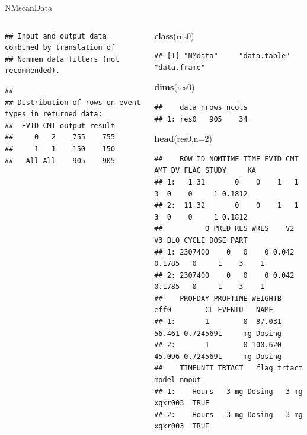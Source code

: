 \documentclass[
  8pt,
  ignorenonframetext,
  aspectratio=169]{beamer}
\newenvironment{Shaded}{\begin{snugshade}}{\end{snugshade}}
\newcommand{\DataTypeTok}[1]{\textcolor[rgb]{0.13,0.29,0.53}{#1}}
\newcommand{\DecValTok}[1]{\textcolor[rgb]{0.00,0.00,0.81}{#1}}
\newcommand{\KeywordTok}[1]{\textcolor[rgb]{0.13,0.29,0.53}{\textbf{#1}}}
\newcommand{\NormalTok}[1]{#1}
\begin{document}
\begin{frame}[fragile]{NMscanData}
\begin{columns}[T]
\begin{column}{0.48\textwidth}
\begin{verbatim}
## Input and output data combined by translation of
## Nonmem data filters (not recommended).
\end{verbatim}

\begin{verbatim}
## 
## Distribution of rows on event types in returned data:
##  EVID CMT output result
##     0   2    755    755
##     1   1    150    150
##   All All    905    905
\end{verbatim}
\end{column}

\pause

\begin{column}{0.48\textwidth}
\begin{Shaded}
\begin{Highlighting}[]
\KeywordTok{class}\NormalTok{(res0)}
\end{Highlighting}
\end{Shaded}

\begin{verbatim}
## [1] "NMdata"     "data.table" "data.frame"
\end{verbatim}

\begin{Shaded}
\begin{Highlighting}[]
\KeywordTok{dims}\NormalTok{(res0)}
\end{Highlighting}
\end{Shaded}

\begin{verbatim}
##    data nrows ncols
## 1: res0   905    34
\end{verbatim}

\begin{Shaded}
\begin{Highlighting}[]
\KeywordTok{head}\NormalTok{(res0,}\DataTypeTok{n=}\DecValTok{2}\NormalTok{)}
\end{Highlighting}
\end{Shaded}

\begin{verbatim}
##    ROW ID NOMTIME TIME EVID CMT AMT DV FLAG STUDY     KA
## 1:   1 31       0    0    1   1   3  0    0     1 0.1812
## 2:  11 32       0    0    1   1   3  0    0     1 0.1812
##          Q PRED RES WRES    V2     V3 BLQ CYCLE DOSE PART
## 1: 2307400    0   0    0 0.042 0.1785   0     1    3    1
## 2: 2307400    0   0    0 0.042 0.1785   0     1    3    1
##    PROFDAY PROFTIME WEIGHTB   eff0        CL EVENTU   NAME
## 1:       1        0  87.031 56.461 0.7245691     mg Dosing
## 2:       1        0 100.620 45.096 0.7245691     mg Dosing
##    TIMEUNIT TRTACT   flag trtact   model nmout
## 1:    Hours   3 mg Dosing   3 mg xgxr003  TRUE
## 2:    Hours   3 mg Dosing   3 mg xgxr003  TRUE
\end{verbatim}

\normalsize
\end{column}
\end{columns}
\end{frame}
\end{document}
